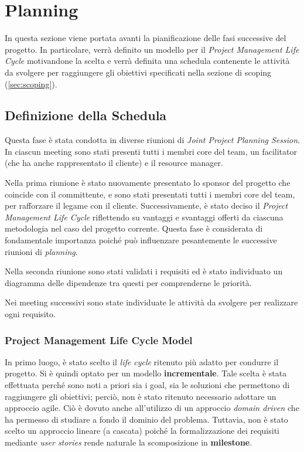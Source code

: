 \section{Planning}
\label{sec:planning}

In questa sezione viene portata avanti la pianificazione delle fasi successive del progetto. In particolare, verrà definito un modello per il \textit{Project Management Life Cycle} motivandone la scelta e verrà definita una schedula contenente le attività da svolgere per raggiungere gli obiettivi specificati nella sezione di scoping (\ref{sec:scoping}).

\subsection{Definizione della Schedula}
Questa fase è stata condotta in diverse riunioni di \textit{Joint Project Planning Session}. In ciascun meeting sono stati presenti tutti i membri core del team, un facilitator (che ha anche rappresentato il cliente) e il resource manager.

Nella prima riunione è stato nuovamente presentato lo sponsor del progetto che coincide con il committente, e sono stati presentati tutti i membri core del team, per rafforzare il legame con il cliente. Successivamente, è stato deciso il \textit{Project Management Life Cycle} riflettendo su vantaggi e svantaggi offerti da ciascuna metodologia nel caso del progetto corrente. Questa fase è considerata di fondamentale importanza poiché può influenzare pesantemente le successive riunioni di \textit{planning}.

Nella seconda riunione sono stati validati i requisiti ed è stato individuato un diagramma delle dipendenze tra questi per comprenderne le priorità.

Nei meeting successivi sono state individuate le attività da svolgere per realizzare ogni requisito.

\subsubsection{Project Management Life Cycle Model}
In primo luogo, è stato scelto il \textit{life cycle} ritenuto più adatto per condurre il progetto. Si è quindi optato per un modello \textbf{incrementale}. Tale scelta è stata effettuata perché sono noti a priori sia i goal, sia le soluzioni che permettono di raggiungere gli obiettivi; perciò, non è stato ritenuto necessario adottare un approccio agile. Ciò è dovuto anche all'utilizzo di un approccio \textit{domain driven} che ha permesso di studiare a fondo il dominio del problema. Tuttavia, non è stato scelto un approccio lineare (a cascata) poiché la formalizzazione dei requisiti mediante \textit{user stories} rende naturale la scomposizione in \textbf{milestone}.

